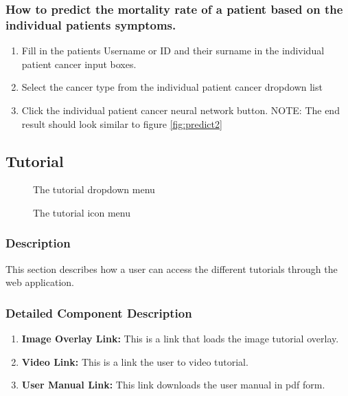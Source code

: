 \documentclass[14pt, a4paper]{article}
\begin{document}
	\subsubsection{How to predict the mortality rate of a patient based on the individual patients symptoms.}
		\begin{enumerate}
			\item Fill in the patients Username or ID and their surname in the individual patient cancer input boxes.
			\item Select the cancer type from the individual patient cancer dropdown list
			\item Click the individual patient cancer neural network button. NOTE: The end result should look similar to figure \ref{fig:predict2}
		\end{enumerate}
\subsection{Tutorial} 
	\begin{figure}[H]
		\centerline{}
		\caption{The tutorial dropdown menu}
		\label{fig:tut1}
	\end{figure}
	\begin{figure}[H]
		\centerline{}
		\caption{The tutorial icon menu}
		\label{fig:tut2}
	\end{figure}
	\subsubsection{Description}This section describes how a user can access the different tutorials through the web application.
	\subsubsection{Detailed Component Description}
		\begin{enumerate}
			\item \textbf{Image Overlay Link:} This is a link that loads the image tutorial overlay.
			\item \textbf{Video Link:} This is a link the user to video tutorial.
			\item \textbf{User Manual Link:} This link downloads the user manual in pdf form.
		\end{enumerate}
\end{document}
